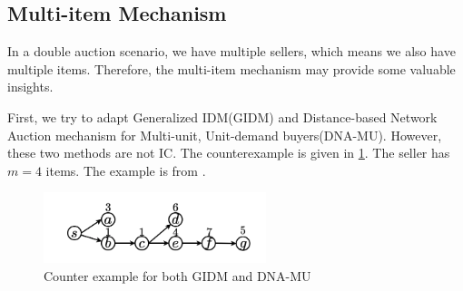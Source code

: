 \subsection{Multi-item Mechanism}
In a double auction scenario, we have multiple sellers, which means we also have multiple items. Therefore,
the multi-item mechanism may provide some valuable insights.\par
First, we try to adapt Generalized IDM(GIDM)\cite{GIDM} and Distance-based Network Auction mechanism for Multi-unit, Unit-demand buyers(DNA-MU)\cite{DNA-MU}.
However, these two methods are not IC. The counterexample is given in \ref*{fig:GIDMCounter}. The seller has
\(m = 4\) items. The example is from \cite{MUDAN-MUDAR}.
\begin{figure}[htbp]
  \includegraphics{./figure/GIDM_counter.png}
  \caption{Counter example for both GIDM and DNA-MU}
  \label{fig:GIDMCounter}
\end{figure}
